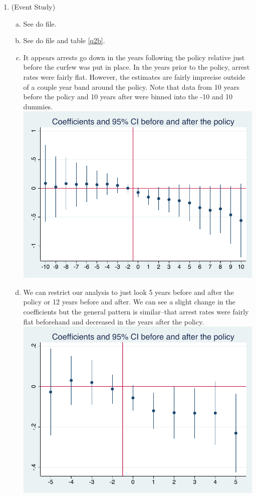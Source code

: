 \documentclass[11pt]{article}
\begin{document}
\begin{enumerate}[1)]
	\item (Event Study)
	\begin{enumerate}[(a)]
		\item See do file.
		\item See do file and table \ref{q2b}. \\
		
		\item  It appears arrests go down in the years following the policy relative just before the curfew was put in place. In the years prior to the policy, arrest rates were fairly flat. However, the estimates are fairly imprecise outside of a couple year band around the policy. Note that data from 10 years before the policy and 10 years after were binned into the -10 and 10 dummies.\\
		\includegraphics[scale=.8]{input/coef_plot_10year.pdf}
		\item We can restrict our analysis to just look 5 years before and after the policy or 12 years before and after. We can see a slight change in the coefficients but the general pattern is similar--that arrest rates were fairly flat beforehand and decreased in the years after the policy.\\
			\includegraphics[scale=.8]{input/coef_plot_5year.pdf} \\

\end{enumerate}
\end{enumerate}
\end{document}
